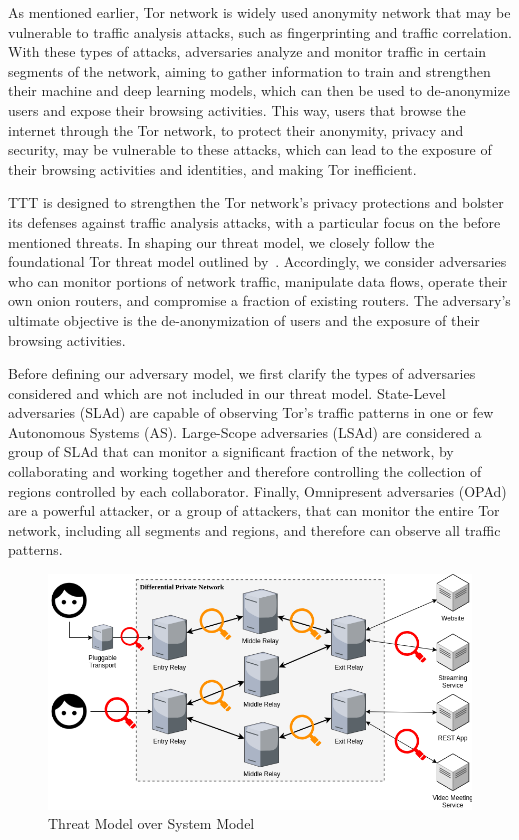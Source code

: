 As mentioned earlier, Tor network is widely used anonymity network that may be vulnerable to traffic analysis attacks, such as fingerprinting and traffic correlation. With these types of attacks, adversaries analyze and monitor traffic in certain segments of the network, aiming to gather information to train and strengthen their machine and deep learning models, which can then be used to de-anonymize users and expose their browsing activities. This way, users that browse the internet through the Tor network, to protect their anonymity, privacy and security, may be vulnerable to these attacks, which can lead to the exposure of their browsing activities and identities, and making Tor inefficient. 

TTT is designed to strengthen the Tor network's privacy protections and bolster its defenses against traffic analysis attacks, with a particular focus on the before mentioned threats. In shaping our threat model, we closely follow the foundational Tor threat model outlined by~\cite{dingledine2004tor}. Accordingly, we consider adversaries who can monitor portions of network traffic, manipulate data flows, operate their own onion routers, and compromise a fraction of existing routers. The adversary's ultimate objective is the de-anonymization of users and the exposure of their browsing activities.

Before defining our adversary model, we first clarify the types of adversaries considered and which are not included in our threat model. State-Level adversaries (SLAd) are capable of observing Tor's traffic patterns in one or few Autonomous Systems (AS). Large-Scope adversaries (LSAd) are considered a group of SLAd that can monitor a significant fraction of the network, by collaborating and working together and therefore controlling the collection of regions controlled by each collaborator. Finally, Omnipresent adversaries (OPAd) are a powerful attacker, or a group of attackers, that can monitor the entire Tor network, including all segments and regions, and therefore can observe all traffic patterns.

\begin{figure}[!h]
  \centering
  \includegraphics[width=\textwidth]{Chapters/Figures/Threat_Model.png}
  \caption{Threat Model over System Model}\label{fig:thread_model}
\end{figure}


